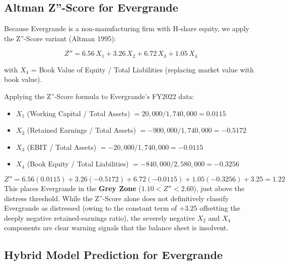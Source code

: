 \documentclass[12pt, a4paper]{article}
\begin{document}
\subsection{Altman Z''-Score for Evergrande}

Because Evergrande is a non-manufacturing firm with H-share equity, we apply the Z''-Score variant (Altman 1995):

\begin{equation}
  Z'' = 6.56\,X_1 + 3.26\,X_2 + 6.72\,X_3 + 1.05\,X_4
\end{equation}

with $X_4$ = Book Value of Equity / Total Liabilities (replacing market value with book value).

Applying the Z''-Score formula to Evergrande's FY2022 data:
\begin{itemize}
  \item $X_1$ (Working Capital / Total Assets) $= 20{,}000 / 1{,}740{,}000 = 0.0115$
  \item $X_2$ (Retained Earnings / Total Assets) $= -900{,}000 / 1{,}740{,}000 = -0.5172$
  \item $X_3$ (EBIT / Total Assets) $= -20{,}000 / 1{,}740{,}000 = -0.0115$
  \item $X_4$ (Book Equity / Total Liabilities) $= -840{,}000 / 2{,}580{,}000 = -0.3256$
\end{itemize}
\[
  Z'' = 6.56(0.0115) + 3.26(-0.5172) + 6.72(-0.0115) + 1.05(-0.3256) + 3.25 = \mathbf{1.22}
\]
This places Evergrande in the \textbf{Grey Zone} ($1.10 < Z'' < 2.60$), just above the distress threshold.  While the Z''-Score alone does not definitively classify Evergrande as distressed (owing to the constant term of $+3.25$ offsetting the deeply negative retained-earnings ratio), the severely negative $X_2$ and $X_4$ components are clear warning signals that the balance sheet is insolvent.

\subsection{Hybrid Model Prediction for Evergrande}
\end{document}
